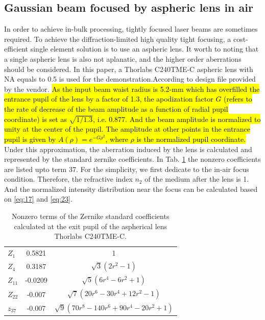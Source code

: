 \documentclass[9pt,twocolumn,twoside]{osajnl}
\begin{document}
\subsection{Gaussian beam focused by aspheric lens in air}
In order to achieve in-bulk processing, tightly focused laser beams are sometimes required. To achieve the diffraction-limited high quality tight focusing, a cost-efficient single element solution is to use an aspheric lens. It worth to noting that a single aspheric lens is also not aplanatic, and the higher order aberrations should be considered.
In this paper, a Thorlabs C240TME-C aspheric lens with NA equals to 0.5 is used for the demonstration.According to design file provided by the vendor. \hl{As the input beam waist radius is 5.2-mm which has overfilled the entrance pupil of the lens by a factor of 1.3, the apodization factor $G$ (refers to the rate of decrease of the beam amplitude as a function of radial pupil coordinate) is set as $\sqrt{1/1.3}$, i.e. 0.877. And the beam amplitude is normalized to unity at the center of the pupil. The amplitude at other points in the entrance pupil is given by $A(\rho)=e^{-G\rho^2}$, where $\rho$ is the normalized pupil coordinate.} Under this approximation, the aberration induced by the lens is calculated and represented by the standard zernike coefficients. In Tab. \ref{tab:3} the nonzero coefficients are listed upto term 37. For the simplicity, we first dedicate to the in-air focus condition. Therefore, the refractive index $n_2$ of the medium after the lens is 1. And the normalized intensity distribution near the focus can be calculated based on \eqref{eq:17} and \eqref{eq:23}. 
\begin{table}
	\centering
	\begin{tabular}[c]{|l|c|c|}
		\hline
		\rowcolor{lightgray}
		$Z_1$ & 0.5821 & 1 \\
		$Z_4$ & 0.3187 & $\sqrt{3}(2r^2-1)$ \\
		\rowcolor{lightgray}
		$Z_{11}$ & -0.0209 & $\sqrt{5}(6r^4-6r^2+1)$ \\
		$Z_{22}$ & -0.007 & $\sqrt{7}(20r^6-30r^4+12r^2-1)$\\
		\rowcolor{lightgray}
		$z_{37}$ & -0.007 & $\sqrt{9}(70r^8-140r^6+90r^4-20r^2+1)$\\
		\hline
	\end{tabular}	
	\caption{Nonzero terms of the Zernike standard coefficients calculated at the exit pupil of the aspherical lens Thorlabs C240TME-C.}\label{tab:3}
\end{table}
\end{document}
